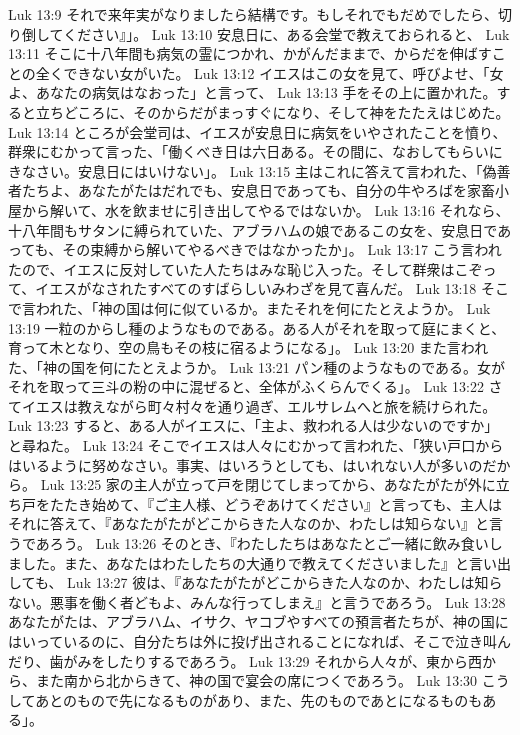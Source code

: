 Luk 13:9  それで来年実がなりましたら結構です。もしそれでもだめでしたら、切り倒してください』」。
Luk 13:10  安息日に、ある会堂で教えておられると、
Luk 13:11  そこに十八年間も病気の霊につかれ、かがんだままで、からだを伸ばすことの全くできない女がいた。
Luk 13:12  イエスはこの女を見て、呼びよせ、「女よ、あなたの病気はなおった」と言って、
Luk 13:13  手をその上に置かれた。すると立ちどころに、そのからだがまっすぐになり、そして神をたたえはじめた。
Luk 13:14  ところが会堂司は、イエスが安息日に病気をいやされたことを憤り、群衆にむかって言った、「働くべき日は六日ある。その間に、なおしてもらいにきなさい。安息日にはいけない」。
Luk 13:15  主はこれに答えて言われた、「偽善者たちよ、あなたがたはだれでも、安息日であっても、自分の牛やろばを家畜小屋から解いて、水を飲ませに引き出してやるではないか。
Luk 13:16  それなら、十八年間もサタンに縛られていた、アブラハムの娘であるこの女を、安息日であっても、その束縛から解いてやるべきではなかったか」。
Luk 13:17  こう言われたので、イエスに反対していた人たちはみな恥じ入った。そして群衆はこぞって、イエスがなされたすべてのすばらしいみわざを見て喜んだ。
Luk 13:18  そこで言われた、「神の国は何に似ているか。またそれを何にたとえようか。
Luk 13:19  一粒のからし種のようなものである。ある人がそれを取って庭にまくと、育って木となり、空の鳥もその枝に宿るようになる」。
Luk 13:20  また言われた、「神の国を何にたとえようか。
Luk 13:21  パン種のようなものである。女がそれを取って三斗の粉の中に混ぜると、全体がふくらんでくる」。
Luk 13:22  さてイエスは教えながら町々村々を通り過ぎ、エルサレムへと旅を続けられた。
Luk 13:23  すると、ある人がイエスに、「主よ、救われる人は少ないのですか」と尋ねた。
Luk 13:24  そこでイエスは人々にむかって言われた、「狭い戸口からはいるように努めなさい。事実、はいろうとしても、はいれない人が多いのだから。
Luk 13:25  家の主人が立って戸を閉じてしまってから、あなたがたが外に立ち戸をたたき始めて、『ご主人様、どうぞあけてください』と言っても、主人はそれに答えて、『あなたがたがどこからきた人なのか、わたしは知らない』と言うであろう。
Luk 13:26  そのとき、『わたしたちはあなたとご一緒に飲み食いしました。また、あなたはわたしたちの大通りで教えてくださいました』と言い出しても、
Luk 13:27  彼は、『あなたがたがどこからきた人なのか、わたしは知らない。悪事を働く者どもよ、みんな行ってしまえ』と言うであろう。
Luk 13:28  あなたがたは、アブラハム、イサク、ヤコブやすべての預言者たちが、神の国にはいっているのに、自分たちは外に投げ出されることになれば、そこで泣き叫んだり、歯がみをしたりするであろう。
Luk 13:29  それから人々が、東から西から、また南から北からきて、神の国で宴会の席につくであろう。
Luk 13:30  こうしてあとのもので先になるものがあり、また、先のものであとになるものもある」。
